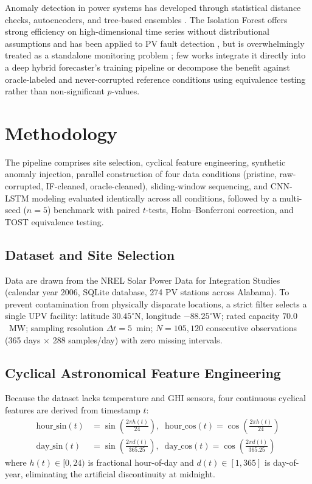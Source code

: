 \documentclass[conference]{IEEEtran}
\begin{document}
Anomaly detection in power systems has developed through statistical distance checks, autoencoders, and tree-based ensembles \cite{zhang2021survey}. The Isolation Forest \cite{liu2008isolation} offers strong efficiency on high-dimensional time series without distributional assumptions and has been applied to PV fault detection \cite{jorry2026unsupervised}, but is overwhelmingly treated as a standalone monitoring problem \cite{zhang2021survey}; few works integrate it directly into a deep hybrid forecaster's training pipeline or decompose the benefit against oracle-labeled and never-corrupted reference conditions using equivalence testing rather than non-significant $p$-values.

\section{Methodology}

The pipeline comprises site selection, cyclical feature engineering, synthetic anomaly injection, parallel construction of four data conditions (pristine, raw-corrupted, IF-cleaned, oracle-cleaned), sliding-window sequencing, and CNN-LSTM modeling evaluated identically across all conditions, followed by a multi-seed ($n=5$) benchmark with paired $t$-tests, Holm--Bonferroni correction, and TOST equivalence testing.

\subsection{Dataset and Site Selection}
Data are drawn from the NREL Solar Power Data for Integration Studies (calendar year 2006, SQLite database, 274 PV stations across Alabama). To prevent contamination from physically disparate locations, a strict filter selects a single UPV facility: latitude $30.45^\circ$N, longitude $-88.25^\circ$W; rated capacity $70.0$~MW; sampling resolution $\Delta t = 5$~min; $N = 105{,}120$ consecutive observations (365 days $\times$ 288 samples/day) with zero missing intervals.
\vspace{5pt}
\subsection{Cyclical Astronomical Feature Engineering}
Because the dataset lacks temperature and GHI sensors, four continuous cyclical features are derived from timestamp $t$:
\begin{align}
\text{hour\_sin}(t) &= \sin\!\left(\frac{2\pi h(t)}{24}\right), \;\;
\text{hour\_cos}(t) = \cos\!\left(\frac{2\pi h(t)}{24}\right) \\
\text{day\_sin}(t) &= \sin\!\left(\frac{2\pi d(t)}{365.25}\right), \;\;
\text{day\_cos}(t) = \cos\!\left(\frac{2\pi d(t)}{365.25}\right)
\end{align}
where $h(t) \in [0, 24)$ is fractional hour-of-day and $d(t) \in [1, 365]$ is day-of-year, eliminating the artificial discontinuity at midnight.
\vspace{5pt}
\end{document}
